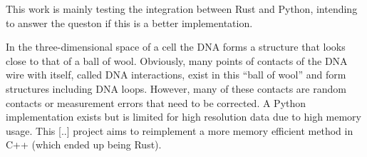 
This work is mainly testing the integration between Rust and Python, intending
to answer the queston if this is a better implementation.

In the three-dimensional space of a cell the DNA forms a structure that looks
close to that of a ball of wool. Obviously, many points of contacts of the DNA
wire with itself, called DNA interactions, exist in this ``ball of wool'' and
form structures including DNA loops. However, many of these contacts are
random contacts or measurement errors that need to be corrected. A Python
implementation exists but is limited for high resolution data due to high
memory usage. This [..] project aims to reimplement a more memory efficient
method in C++ (which ended up being Rust).



